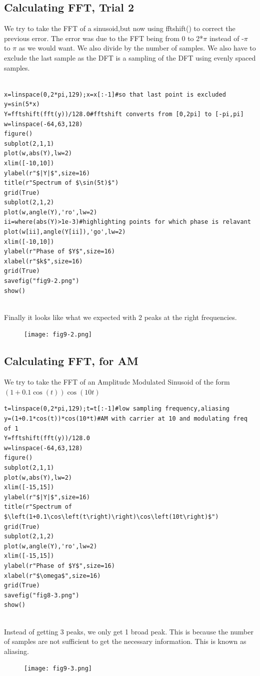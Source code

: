 \documentclass[11pt, a4paper]{article}
\begin{document}
\subsection{Calculating FFT, Trial 2} 
{
We try to take the FFT of a sinusoid,but now using fftshift() to correct the previous error. The error was due to the FFT being from 0 to 2*$\pi$ instead of -$\pi$ to $\pi$ as we would want. We also divide by the number of samples.
We also have to exclude the last sample as the DFT is a sampling of the DFT using evenly spaced samples.
}
\begin{verbatim}

x=linspace(0,2*pi,129);x=x[:-1]#so that last point is excluded
y=sin(5*x)
Y=fftshift(fft(y))/128.0#fftshift converts from [0,2pi] to [-pi,pi] 
w=linspace(-64,63,128)
figure()
subplot(2,1,1)
plot(w,abs(Y),lw=2)
xlim([-10,10])
ylabel(r"$|Y|$",size=16)
title(r"Spectrum of $\sin(5t)$")
grid(True)
subplot(2,1,2)
plot(w,angle(Y),'ro',lw=2)
ii=where(abs(Y)>1e-3)#highlighting points for which phase is relavant
plot(w[ii],angle(Y[ii]),'go',lw=2)
xlim([-10,10])
ylabel(r"Phase of $Y$",size=16)
xlabel(r"$k$",size=16)
grid(True)
savefig("fig9-2.png")
show()


\end{verbatim}
{
Finally it looks like what we expected with 2 peaks at the right frequencies.
}
\begin{figure}[!tbh]
   	\centering
   	\texttt{[image: fig9-2.png]}
   	\label{fig:01}
   \end{figure}

\subsection{Calculating FFT, for AM} 
{
We try to take the FFT of an Amplitude Modulated Sinusoid of the form
$\left(1+0.1\cos\left(t\right)\right)\cos\left(10t\right)$
}
\begin{verbatim}
t=linspace(0,2*pi,129);t=t[:-1]#low sampling frequency,aliasing
y=(1+0.1*cos(t))*cos(10*t)#AM with carrier at 10 and modulating freq of 1
Y=fftshift(fft(y))/128.0
w=linspace(-64,63,128)
figure()
subplot(2,1,1)
plot(w,abs(Y),lw=2)
xlim([-15,15])
ylabel(r"$|Y|$",size=16)
title(r"Spectrum of $\left(1+0.1\cos\left(t\right)\right)\cos\left(10t\right)$")
grid(True)
subplot(2,1,2)
plot(w,angle(Y),'ro',lw=2)
xlim([-15,15])
ylabel(r"Phase of $Y$",size=16)
xlabel(r"$\omega$",size=16)
grid(True)
savefig("fig8-3.png")
show()


\end{verbatim}
{
Instead of getting 3 peaks, we only get 1 broad peak. This is because the number of samples are not sufficient to get the necessary information. This is known as aliasing.
}
\begin{figure}[!tbh]
   	\centering
   	\texttt{[image: fig9-3.png]}
   	\label{fig:01}
   \end{figure}
\end{document}
